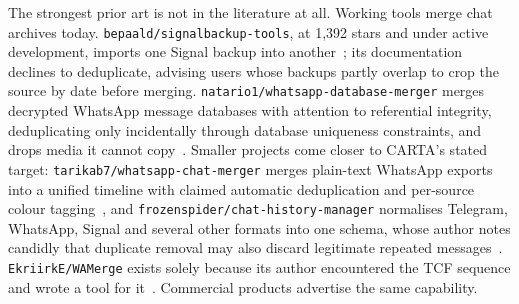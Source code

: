 The strongest prior art is not in the literature at all. Working tools merge chat
archives today. \texttt{bepaald/\allowbreak signalbackup-tools}, at 1,392 stars and under
active development, imports one Signal backup into
another~\citep{repo_signalbackuptools}; its documentation declines to deduplicate,
advising users whose backups partly overlap to crop the source by date before
merging. \texttt{natario1/\allowbreak whatsapp-database-merger} merges decrypted WhatsApp
message databases with attention to referential integrity, deduplicating only
incidentally through database uniqueness constraints, and drops media it cannot
copy~\citep{repo_wadbmerger}. Smaller projects come closer to CARTA's stated
target: \texttt{tarikab7/\allowbreak whatsapp-chat-merger} merges plain-text WhatsApp exports
into a unified timeline with claimed automatic deduplication and per-source colour
tagging~\citep{repo_wachatmerger}, and \texttt{frozenspider/\allowbreak chat-history-manager}
normalises Telegram, WhatsApp, Signal and several other formats into one schema,
whose author notes candidly that duplicate removal may also discard legitimate
repeated messages~\citep{repo_chathistorymanager}. \texttt{EkriirkE/\allowbreak WAMerge} exists
solely because its author encountered the TCF sequence and wrote a tool for
it~\citep{repo_wamerge}. Commercial products advertise the same capability.

